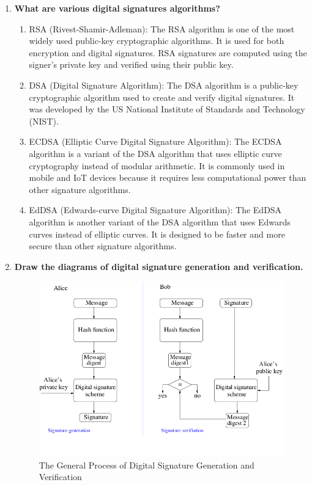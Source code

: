 \documentclass[openany]{book}
\begin{document}
\begin{enumerate}
    \item \textbf{What are various digital signatures algorithms?}\\
          \begin{enumerate}
              \item RSA (Rivest-Shamir-Adleman): The RSA algorithm is one of the most widely used public-key cryptographic algorithms. It is used for both encryption and digital signatures. RSA signatures are computed using the signer's private key and verified using their public key.

              \item DSA (Digital Signature Algorithm): The DSA algorithm is a public-key cryptographic algorithm used to create and verify digital signatures. It was developed by the US National Institute of Standards and Technology (NIST).

              \item ECDSA (Elliptic Curve Digital Signature Algorithm): The ECDSA algorithm is a variant of the DSA algorithm that uses elliptic curve cryptography instead of modular arithmetic. It is commonly used in mobile and IoT devices because it requires less computational power than other signature algorithms.

              \item EdDSA (Edwards-curve Digital Signature Algorithm): The EdDSA algorithm is another variant of the DSA algorithm that uses Edwards curves instead of elliptic curves. It is designed to be faster and more secure than other signature algorithms.
          \end{enumerate}

    \item \textbf{Draw the diagrams of digital signature generation and verification.}\\

          \begin{figure}[H]
              \centering
              \includegraphics[width=.80\textwidth]{./Digital-signature-generation-and-verification.png}
              \caption{The General Process of Digital Signature Generation and Verification}
          \end{figure}


\end{enumerate}
\end{document}
